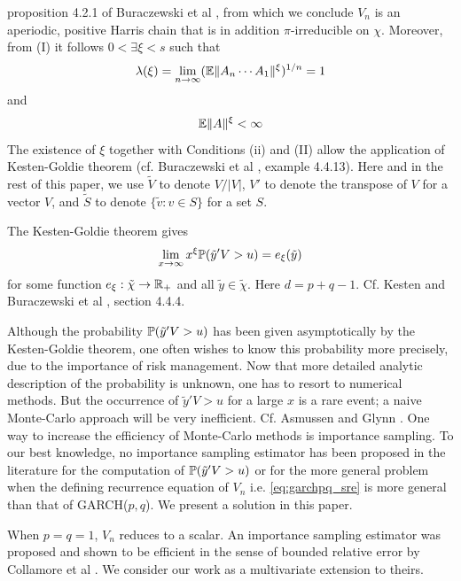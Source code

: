 \documentclass[aoas,preprint]{imsart}
\numberwithin{equation}{section}
\theoremstyle{plain}
\begin{document}
proposition 4.2.1 of Buraczewski et al
\cite{buraczewski:damek:mikosch:2016}, from which we conclude $V_n$ is
an aperiodic, positive Harris chain that is in addition
$\pi$-irreducible on $\chi$.
Moreover, from (I) it follows $0 < \exists \xi < s$ such that
\begin{equation}
  \label{eq:hyt}
  \lambda(\xi) = \lim_{n \to \infty} (\E \|A_n \cdots A_1\|^\xi)^{1/n} = 1
\end{equation}
and
\begin{equation}
  \label{eq:jui}
  \E \|A\|^\xi < \infty
\end{equation}
The existence of $\xi$ together with Conditions (ii) and (II)
allow the application of Kesten-Goldie theorem (cf. Buraczewski et al
\cite{buraczewski:damek:mikosch:2016}, example 4.4.13). Here and in
the rest of this paper, we use $\tilde V$ to denote $V/|V|$, $V'$ to
denote the transpose of $V$ for a vector $V$,
and $\tilde S$ to denote $\{\tilde v: v \in S\}$ for a set $S$.

The Kesten-Goldie theorem gives
\begin{equation}
  \label{eq:kesten}
  \lim_{x \to \infty} x^{\xi} \P(\tilde y' V > u) = e_\xi(\tilde y)  
\end{equation}
for some function $e_\xi: \tilde \chi \to \reals_+$ and
all $\tilde y \in \tilde \chi$. Here $d = p + q - 1$. Cf. Kesten
\cite{kesten:1973} and  Buraczewski et al
\cite{buraczewski:damek:mikosch:2016},
section 4.4.4.

Although the probability $\P(\tilde y' V > u)$ has been given
asymptotically by the Kesten-Goldie theorem, one often wishes to know
this probability more precisely, due to the importance of risk
management. Now that more detailed analytic description of the
probability is unknown, one has to resort to numerical methods. But
the occurrence of $\tilde y' V > u$ for a large $x$ is a rare event; a
naive Monte-Carlo approach will be very inefficient. Cf. Asmussen and
Glynn \cite{opac-b1123521}.
One way to increase the efficiency of Monte-Carlo methods is
importance sampling. To our best knowledge, no importance sampling
estimator has been proposed in the literature for the computation of
$\P(\tilde y' V > u)$ or for the more general problem when the
defining recurrence equation of $V_n$ i.e. \eqref{eq:garchpq_sre} is 
more general than that of GARCH($p, q$). We present a solution in this
paper.

When $p = q = 1$, $V_n$ reduces to a scalar. An importance sampling
estimator was proposed and shown to be efficient in the sense of
bounded relative error by Collamore et al \cite{collamore2014}. We
consider our work as a multivariate extension to theirs.
\end{document}
